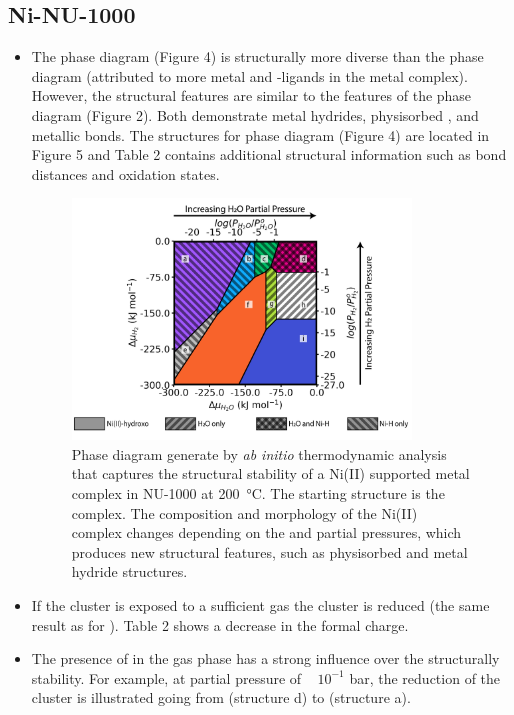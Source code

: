 \documentclass[12pt]{article}
\begin{document}
\subsection{Ni-NU-1000}
\begin{itemize}
    \item The  phase diagram (Figure 4) is structurally more diverse than the  phase diagram (attributed to more metal and -ligands in the  metal complex). However, the  structural features are similar to the features of the  phase diagram (Figure 2). Both demonstrate metal hydrides, physisorbed , and metallic bonds. The structures for phase diagram (Figure 4) are located in Figure 5 and Table 2 contains additional structural information such as  bond distances and  oxidation states. 
    \begin{figure}[H]
        \centering
        \includegraphics[width=0.85\textwidth]{zi-images/01-Ni-Graphics/2020-08-31-Phase-Diagram-V02.png}
        \caption{Phase diagram generate by \textit{ab initio} thermodynamic analysis that captures the structural stability of a Ni(II) supported metal complex in NU-1000 at \SI{200}{\celsius}. The starting structure is the  complex. The composition and morphology of the Ni(II) complex changes depending on the  and  partial pressures, which produces new structural features, such as physisorbed  and metal hydride structures.}
        \label{fig:phasediagramNi4}
    \end{figure}
    \item If the cluster is exposed to a sufficient  gas the cluster is reduced (the same result as for ). Table 2 shows a decrease in the  formal charge. 
    \item The presence of  in the gas phase has a strong influence over the structurally stability. For example, at  partial pressure of ~ $10^{-1}$ bar, the reduction of the cluster is illustrated going from  (structure d) to  (structure a). 

\end{itemize}
\end{document}
